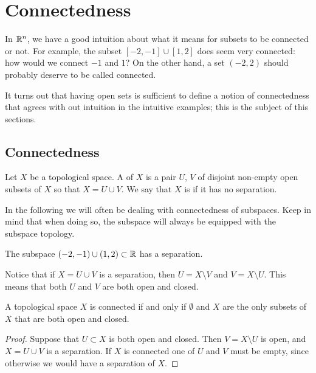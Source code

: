 \section{Connectedness}
\label{connectedness}
In $\mathbb{R}^n$, we have a good intuition about what it means for subsets to be connected or not. For example, the subset $[-2,-1] \cup [1,2]$ does seem very connected: how would we connect $-1$ and $1$? On the other hand, a set $(-2,2)$ should probably deserve to be called connected.

It turns out that having open sets is sufficient to define a notion of connectedness that agrees with out intuition in the intuitive examples; this is the subject of this sections.

\subsection{Connectedness}
\begin{defn}
  Let $X$ be a topological space. A  of $X$ is a pair $U$, $V$ of disjoint non-empty open subsets of $X$ so that $X = U \cup V$. We say that $X$ is  if it has no separation.
\end{defn}
In the following we will often be dealing with connectedness of subspaces. Keep in mind that when doing so, the subspace will always be equipped with the subspace topology.
\begin{example}
  The subspace $(-2,-1) \cup (1,2) \subset \mathbb{R}$ has a separation.
\end{example}
Notice that if $X = U \cup V$ is a separation, then $U = X \setminus V$ and $V = X \setminus U$. This means that both $U$ and $V$ are both open and closed.
\begin{lem}
  A topological space $X$ is connected if and only if $\emptyset$ and $X$ are the only subsets of $X$ that are both open and closed.
\end{lem}
\begin{proof}
  Suppose that $U \subset X$ is both open and closed. Then $V = X \setminus U$ is open, and $X = U \cup V$ is a separation. If $X$ is connected one of $U$ and $V$ must be empty, since otherwise we would have a separation of $X$.
\end{proof}
